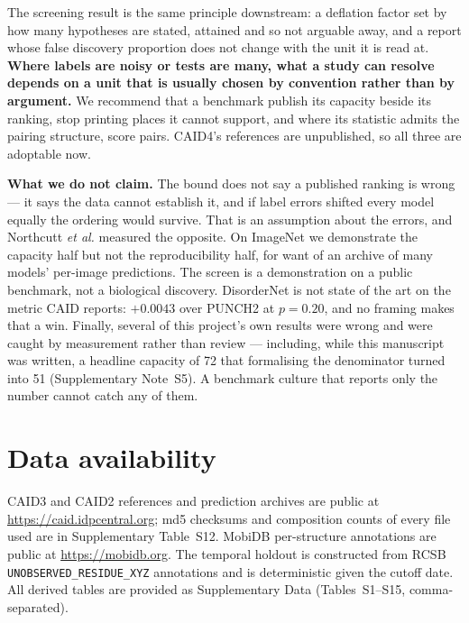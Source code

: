 \documentclass[11pt,a4paper]{article}
\newcommand{\code}[1]{\texttt{\small #1}}
\begin{document}
The screening result is the same principle downstream: a deflation factor set by
how many hypotheses are stated, attained and so not arguable away, and a report
whose false discovery proportion does not change with the unit it is read at.
\textbf{Where labels are noisy or tests are many, what a study can resolve
depends on a unit that is usually chosen by convention rather than by argument.}
We recommend that a benchmark publish its capacity beside its ranking, stop
printing places it cannot support, and where its statistic admits the pairing
structure, score pairs. CAID4's references are unpublished, so all three are
adoptable now.

\textbf{What we do not claim.} The bound does not say a published ranking is
wrong --- it says the data cannot establish it, and if label errors shifted every
model equally the ordering would survive. That is an assumption about the
errors, and Northcutt \emph{et al.} measured the opposite. On ImageNet we
demonstrate the capacity half but not the reproducibility half, for want of an
archive of many models' per-image predictions. The screen is a demonstration on
a public benchmark, not a biological discovery. DisorderNet is not state of the
art on the metric CAID reports: $+0.0043$ over PUNCH2 at $p = 0.20$, and no
framing makes that a win. Finally, several of this project's own results were
wrong and were caught by measurement rather than review --- including, while this
manuscript was written, a headline capacity of 72 that formalising the
denominator turned into 51 (Supplementary Note~S5). A benchmark culture that
reports only the number cannot catch any of them.

\section*{Data availability}
CAID3 and CAID2 references and prediction archives are public at
\url{https://caid.idpcentral.org}; md5 checksums and composition counts of every
file used are in Supplementary Table~S12. MobiDB per-structure annotations are
public at \url{https://mobidb.org}. The temporal holdout is constructed from RCSB
\code{UNOBSERVED\_RESIDUE\_XYZ} annotations and is deterministic given the
cutoff date. All derived tables are provided as Supplementary Data
(Tables~S1--S15, comma-separated).
\end{document}
